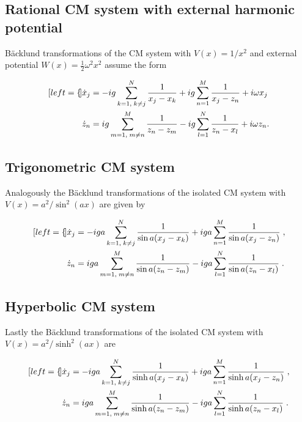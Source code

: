 \subsection{Rational CM system with external harmonic potential}
Bäcklund transformations of the  CM system with $V(x) = {1}/{x^2}$ and external potential $W(x) = \frac{1}{2}\omega^2 x^2$ assume the form

\begin{subequations}
\begin{align}[left=\empheqlbrace]
\dot x_j &= -ig \sum_{k=1,\;k \neq j}^N \frac{1}{x_j - x_k} + ig\sum_{n = 1}^M \frac{1}{x_j - z_n} + i\omega x_j\\
\dot z_n &= ig \sum_{m=1,\;m \neq n}^M \frac{1}{z_n - z_m} - ig\sum_{l = 1}^N \frac{1}{z_n - x_l} + i\omega z_n.
\end{align}
\end{subequations}

\subsection{Trigonometric CM system}
Analogously the Bäcklund transformations of the isolated CM system with $V(x) = {a^2}/{\sin^2{(ax)}}$ are given by

\begin{subequations}
\begin{align}[left=\empheqlbrace]
\dot x_j &= -iga \sum_{k=1,\;k \neq j}^N \frac{1}{\sin{a(x_j - x_k)}} + iga\sum_{n = 1}^M \frac{1}{\sin{a(x_j - z_n)}}\;, \\
\dot z_n &= iga \sum_{m=1,\;m \neq n}^M \frac{1}{\sin{a(z_n - z_m)}} - iga\sum_{l = 1}^N \frac{1}{\sin{a(z_n - x_l)}}\;.
\end{align}
\end{subequations}

\subsection{Hyperbolic CM system}
Lastly the Bäcklund transformations of the isolated CM system with $V(x) = {a^2}/{\sinh^2{(ax)}}$ are

\begin{subequations}
\begin{align}[left=\empheqlbrace]
\dot x_j &= -iga \sum_{k=1,\;k \neq j}^N \frac{1}{\sinh{a(x_j - x_k)}} + iga\sum_{n = 1}^M \frac{1}{\sinh{a(x_j - z_n)}}\;, \\
\dot z_n &= iga \sum_{m=1,\;m \neq n}^M \frac{1}{\sinh{a(z_n - z_m)}} - iga\sum_{l = 1}^N \frac{1}{\sinh{a(z_n - x_l)}}\;.
\end{align}
\end{subequations}